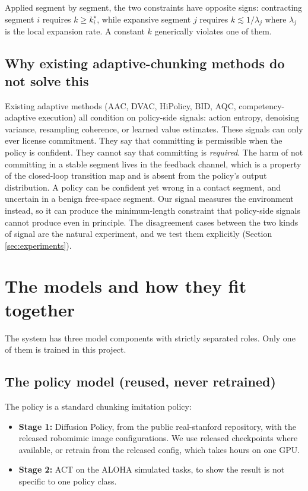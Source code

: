 \documentclass[11pt]{article}
\newcommand{\kstar}{k^{\star}}
\begin{document}
Applied segment by segment, the two constraints have opposite signs: contracting segment
$i$ requires $k \geq \kstar_i$, while expansive segment $j$ requires $k \lesssim
1/\lambda_j$ where $\lambda_j$ is the local expansion rate. A constant $k$ generically
violates one of them.

\subsection{Why existing adaptive-chunking methods do not solve this}

Existing adaptive methods (AAC, DVAC, HiPolicy, BID, AQC, competency-adaptive execution)
all condition on policy-side signals: action entropy, denoising variance, resampling
coherence, or learned value estimates. These signals can only ever license commitment.
They say that committing is permissible when the policy is confident. They cannot say
that committing is \emph{required}. The harm of not committing in a stable segment lives
in the feedback channel, which is a property of the closed-loop transition map and is
absent from the policy's output distribution. A policy can be confident yet wrong in a
contact segment, and uncertain in a benign free-space segment. Our signal measures the
environment instead, so it can produce the minimum-length constraint that policy-side
signals cannot produce even in principle. The disagreement cases between the two kinds
of signal are the natural experiment, and we test them explicitly (Section
\ref{sec:experiments}).

\section{The models and how they fit together}
\label{sec:models}

The system has three model components with strictly separated roles. Only one of them is
trained in this project.

\subsection{The policy model (reused, never retrained)}

The policy is a standard chunking imitation policy:

\begin{itemize}[leftmargin=2em]
  \item \textbf{Stage 1:} Diffusion Policy, from the public real-stanford repository,
        with the released robomimic image configurations. We use released checkpoints
        where available, or retrain from the released config, which takes hours on one
        GPU.
  \item \textbf{Stage 2:} ACT on the ALOHA simulated tasks, to show the result is not
        specific to one policy class.
\end{itemize}
\end{document}
